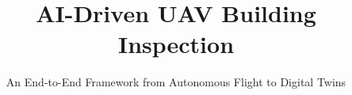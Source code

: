 \documentclass[graybox,envcountchap,sectrefs,openany]{SNmono}
\begin{document}
\title{AI-Driven UAV Building Inspection}
\subtitle{An End-to-End Framework from Autonomous Flight to Digital Twins}
\author{}
\date{}
\maketitle

\frontmatter%


%


%

\tableofcontents



\mainmatter%











%

\backmatter%



\printindex
\end{document}
